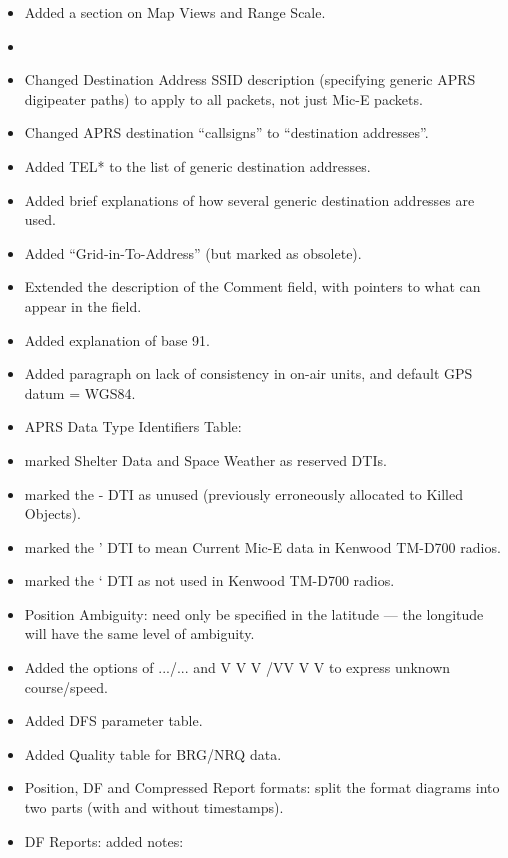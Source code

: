 \begin{itemize}
\item Added a section on Map Views and Range Scale.
\item 
\item   Changed Destination Address SSID description (specifying generic APRS digipeater paths) to apply to all packets, not just Mic-E packets.
\item Changed APRS destination “callsigns” to “destination addresses”.
\item Added TEL* to the list of generic destination addresses.
\item Added brief explanations of how several generic destination addresses are used.
\item Added “Grid-in-To-Address” (but marked as obsolete).
\item Extended the description of the Comment field, with pointers to what can appear in the field.
\item Added explanation of base 91.
\item Added paragraph on lack of consistency in on-air units, and default GPS datum = WGS84.
\item APRS Data Type Identifiers Table:
\item marked Shelter Data and Space Weather as reserved DTIs.
\item marked the - DTI as unused (previously erroneously allocated to Killed Objects).
\item marked the ' DTI to mean Current Mic-E data in Kenwood TM-D700 radios.
\item marked the ‘ DTI as not used in Kenwood TM-D700 radios.
\item Position Ambiguity: need only be specified in the latitude — the longitude will have the same
level of ambiguity.
\item Added the options of .../... and V V V /VV V V to express unknown course/speed.
\item Added DFS parameter table.
\item Added Quality table for BRG/NRQ data.
\item Position, DF and Compressed Report formats: split the format diagrams into two parts (with
and without timestamps).
\item DF Reports: added notes:
\end{itemize}

